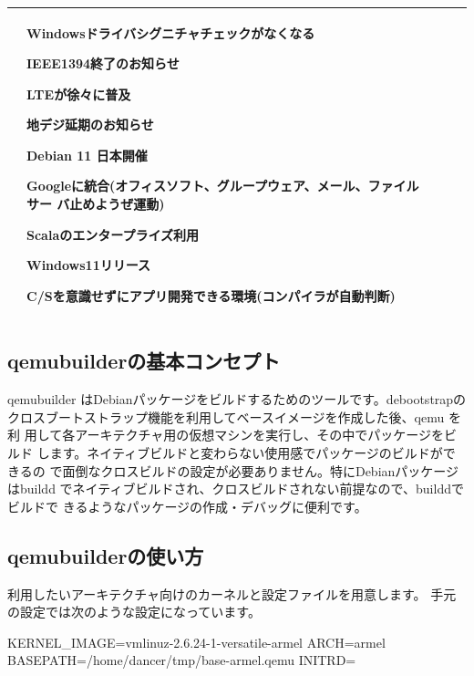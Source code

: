 \documentclass[mingoth,a4paper]{jsarticle}
\begin{document}
{\begin{tabular}[t]{|p{8em}|p{8em}|p{12em}|p{8em}|p{8em}|}
&
Windowsドライバシグニチャチェックがなくなる

IEEE1394終了のお知らせ

LTEが徐々に普及

地デジ延期のお知らせ

Debian 11 日本開催

Googleに統合(オフィスソフト、グループウェア、メール、ファイルサー
		 バ止めようぜ運動)

Scalaのエンタープライズ利用

Windows11リリース

C/Sを意識せずにアプリ開発できる環境(コンパイラが自動判断)

\\

\hline
\end{tabular}

}

\clearpage

\label{sec:qemubuilder-update2009}

\subsection{qemubuilderの基本コンセプト}

qemubuilder はDebianパッケージをビルドするためのツールです。debootstrapの
クロスブートストラップ機能を利用してベースイメージを作成した後、qemu を利
用して各アーキテクチャ用の仮想マシンを実行し、その中でパッケージをビルド
します。ネイティブビルドと変わらない使用感でパッケージのビルドができるの
で面倒なクロスビルドの設定が必要ありません。特にDebianパッケージはbuildd
でネイティブビルドされ、クロスビルドされない前提なので、builddでビルドで
きるようなパッケージの作成・デバッグに便利です。

\subsection{qemubuilderの使い方}

利用したいアーキテクチャ向けのカーネルと設定ファイルを用意します。
手元の設定では次のような設定になっています。
\begin{commandline}
KERNEL_IMAGE=vmlinuz-2.6.24-1-versatile-armel
ARCH=armel
BASEPATH=/home/dancer/tmp/base-armel.qemu
INITRD=
\end{commandline}
\end{document}
